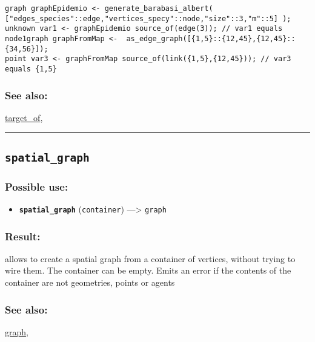 \documentclass[]{book}
\providecommand{\tightlist}{%
  \setlength{\itemsep}{0pt}\setlength{\parskip}{0pt}}
\theoremstyle{definition}
\theoremstyle{definition}
\theoremstyle{definition}
\theoremstyle{remark}
\begin{document}
\begin{verbatim}
graph graphEpidemio <- generate_barabasi_albert( ["edges_species"::edge,"vertices_specy"::node,"size"::3,"m"::5] );  
unknown var1 <- graphEpidemio source_of(edge(3)); // var1 equals node1graph graphFromMap <-  as_edge_graph([{1,5}::{12,45},{12,45}::{34,56}]);  
point var3 <- graphFromMap source_of(link({1,5},{12,45})); // var3 equals {1,5}
\end{verbatim}

\subsubsection{See also:}\label{see-also-189}

\href{OperatorsSZ\#target_of}{target\_of},

\begin{center}\rule{0.5\linewidth}{\linethickness}\end{center}

\subsection{\texorpdfstring{\texttt{spatial\_graph}}{spatial\_graph}}\label{spatial_graph}

\subsubsection{Possible use:}\label{possible-use-488}

\begin{itemize}
\tightlist
\item
  \textbf{\texttt{spatial\_graph}} (\texttt{container})
  ---\textgreater{} \texttt{graph}
\end{itemize}

\subsubsection{Result:}\label{result-472}

allows to create a spatial graph from a container of vertices, without
trying to wire them. The container can be empty. Emits an error if the
contents of the container are not geometries, points or agents

\subsubsection{See also:}\label{see-also-190}

\href{OperatorsDH\#graph}{graph},
\end{document}

